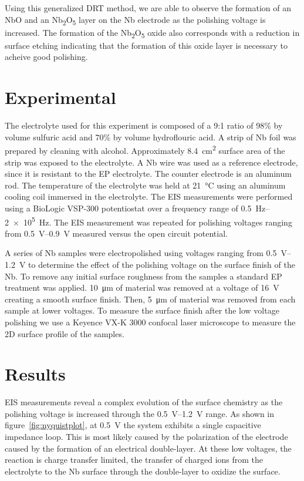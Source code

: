 Using this generalized DRT method, we are able to observe the formation of an NbO and an Nb\textsubscript{2}O\textsubscript{5} layer on the Nb electrode as the polishing voltage is increased. The formation of the Nb\textsubscript{2}O\textsubscript{5} oxide also corresponds with a reduction in surface etching indicating that the formation of this oxide layer is necessary to acheive good polishing.


\section{Experimental}
\label{sec:orgb71f960}

The electrolyte used for this experiment is composed of a 9:1 ratio of 98\% by volume sulfuric acid and 70\% by volume hydroflouric acid. A strip of Nb foil was prepared by cleaning with alcohol. Approximately \qty{8.4}{\centi\meter\squared} surface area of the strip was exposed to the electrolyte. A Nb wire was used as a reference electrode, since it is resistant to the EP electrolyte. The counter electrode is an aluminum rod. The temperature of the electrolyte was held at \qty{21}{\celsius} using an aluminum cooling coil immersed in the electrolyte. The EIS measurements were performed using a BioLogic VSP-300 potentiostat over a frequency range of \qtyrange{0.5}{2e5}{\hertz}. The EIS measurement was repeated for polishing voltages ranging from \qtyrange{0.5}{0.9}{\volt} measured versus the open circuit potential.

A series of Nb samples were electropolished using voltages ranging from \qtyrange{0.5}{1.2}{\volt} to determine the effect of the polishing voltage on the surface finish of the Nb. To remove any initial surface roughness from the samples a standard EP treatment was applied. \qty{10}{\micro\meter} of material was removed at a voltage of \qty{16}{\volt} creating a smooth surface finish. Then, \qty{5}{\micro\meter} of material was removed from each sample at lower voltages. To measure the surface finish after the low voltage polishing we use a Keyence VX-K 3000 confocal laser microscope to measure the 2D surface profile of the samples.



\section{Results}
\label{sec:org4a45003}

EIS measurements reveal a complex evolution of the surface chemistry as the polishing voltage is increased through the \qtyrange{0.5}{1.2}{\volt} range. As shown in figure~\ref{fig:nyquistplot}, at \qty{0.5}{\volt} the system exhibits a single capacitive impedance loop. This is most likely caused by the polarization of the electrode caused by the formation of an electrical double-layer.\cite{eliaz2018physical} At these low voltages, the reaction is charge transfer limited, the transfer of charged ions from the electrolyte to the Nb surface through the double-layer to oxidize the surface.

